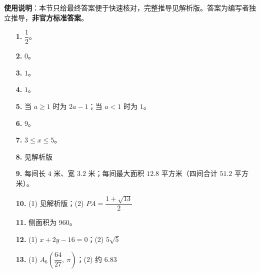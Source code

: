 
\begin{gknotice}
\textbf{使用说明}：本节只给最终答案便于快速核对，完整推导见解析版。答案为编写者独立推导，\textbf{非官方标准答案}。
\end{gknotice}

\begin{itemize}[leftmargin=2.6em]
  \item[\textbf{1.}] $\dfrac{1}{2}$。
  \item[\textbf{2.}] $0$。
  \item[\textbf{3.}] $1$。
  \item[\textbf{4.}] $1$。
  \item[\textbf{5.}] 当 $a\ge1$ 时为 $2a-1$；当 $a<1$ 时为 $1$。
  \item[\textbf{6.}] $9$。
  \item[\textbf{7.}] $3\le x\le5$。
  \item[\textbf{8.}] 见解析版
  \item[\textbf{9.}] 每间长 $4$ 米、宽 $3.2$ 米；每间最大面积 $12.8$ 平方米（四间合计 $51.2$ 平方米）。
  \item[\textbf{10.}] (1) 见解析版；(2) $PA=\dfrac{1+\sqrt{13}}{2}$
  \item[\textbf{11.}] 侧面积为 $960$。
  \item[\textbf{12.}] (1) $x+2y-16=0$；(2) $5\sqrt{5}$
  \item[\textbf{13.}] (1) $A_6\left(\dfrac{64}{27},\ \pi\right)$；(2) 约 $6.83$
\end{itemize}
